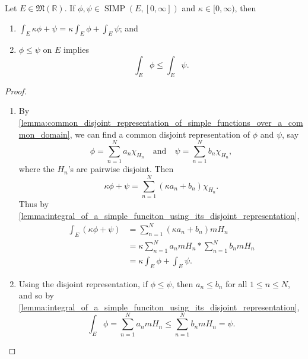 \documentclass[notoc,notitlepage]{tufte-book}
\DeclareMathOperator{\SIMP}{SIMP}
\begin{document}
\begin{propo}\label{propo:linearity_and_monotonicity_of_the_integral_of_simple_functions}
  Let $E \in \mathfrak{M}(\mathbb{R})$. If $\phi, \psi \in \SIMP(E, [0,
  \infty])$ and $\kappa \in [0, \infty)$, then
   \begin{enumerate}
    \item $\int_{E} \kappa \phi + \psi = \kappa \int_{E} \phi + \int_{E} \psi$; and
    \item $\phi \leq \psi$ on $E$ implies
      \begin{equation*}
        \int_{E} \phi \leq \int_{E} \psi.
      \end{equation*}
  \end{enumerate}
\end{propo}

\begin{proof}
  \begin{enumerate}
    \item By
      \cref{lemma:common_disjoint_representation_of_simple_functions_over_a_common_domain},
      we can find a common disjoint representation of $\phi$ and $\psi$, say
      \begin{equation*}
        \phi = \sum_{n=1}^{N} a_n \chi_{H_n} \quad \text{and} \quad
        \psi = \sum_{n=1}^{N} b_n \chi_{H_n},
      \end{equation*}
      where the $H_n$'s are pairwise disjoint. Then
      \begin{equation*}
        \kappa \phi + \psi = \sum_{n=1}^{N} (\kappa a_n + b_n) \chi_{H_n}.
      \end{equation*}
      Thus by
      \cref{lemma:integral_of_a_simple_funciton_using_its_disjoint_representation},
      \begin{align*}
        \int_{E} (\kappa \phi + \psi)
        &= \sum_{n=1}^{N} (\kappa a_n + b_n) m H_n \\
        &= \kappa \sum_{n=1}^{N} a_n mH_n * \sum_{n=1}^{N} b_n mH_n \\
        &= \kappa \int_{E} \phi + \int_{E} \psi.
      \end{align*}

    \item Using the disjoint representation, if $\phi \leq \psi$, then $a_n \leq
      b_n$ for all $1 \leq n \leq N$, and so by
      \cref{lemma:integral_of_a_simple_funciton_using_its_disjoint_representation},
      \begin{equation*}
        \int_{E} \phi = \sum_{n=1}^{N} a_n mH_n \leq \sum_{n=1}^{N} b_n mH_n =
        \psi.
      \end{equation*}
  \end{enumerate}
\end{proof}
\end{document}
